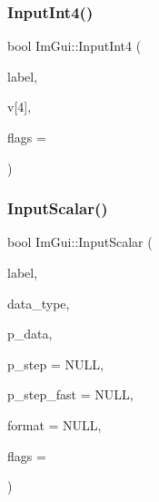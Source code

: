 \mbox{\label{namespaceImGui_a3a57668b83f7a99d295f94baa71add0a}} 
\subsubsection{\texorpdfstring{Input\+Int4()}{InputInt4()}}
{\footnotesize\ttfamily bool Im\+Gui\+::\+Input\+Int4 (\begin{DoxyParamCaption}\item[{const char $\ast$}]{label,  }\item[{int}]{v\mbox{[}4\mbox{]},  }\item[{Im\+Gui\+Input\+Text\+Flags}]{flags = {} }\end{DoxyParamCaption})}

\mbox{\label{namespaceImGui_afdb54540b7480872fbb746f64344b374}} 
\subsubsection{\texorpdfstring{Input\+Scalar()}{InputScalar()}}
{\footnotesize\ttfamily bool Im\+Gui\+::\+Input\+Scalar (\begin{DoxyParamCaption}\item[{const char $\ast$}]{label,  }\item[{Im\+Gui\+Data\+Type}]{data\+\_\+type,  }\item[{\hyperlink{imgui__impl__opengl3__loader_8h_ac668e7cffd9e2e9cfee428b9b2f34fa7}{void} $\ast$}]{p\+\_\+data,  }\item[{const \hyperlink{imgui__impl__opengl3__loader_8h_ac668e7cffd9e2e9cfee428b9b2f34fa7}{void} $\ast$}]{p\+\_\+step = {\ttfamily NULL},  }\item[{const \hyperlink{imgui__impl__opengl3__loader_8h_ac668e7cffd9e2e9cfee428b9b2f34fa7}{void} $\ast$}]{p\+\_\+step\+\_\+fast = {\ttfamily NULL},  }\item[{const char $\ast$}]{format = {\ttfamily NULL},  }\item[{Im\+Gui\+Input\+Text\+Flags}]{flags = {} }\end{DoxyParamCaption})}

\mbox{\label{namespaceImGui_afb17f0092027c09183df498834abace9}} 
